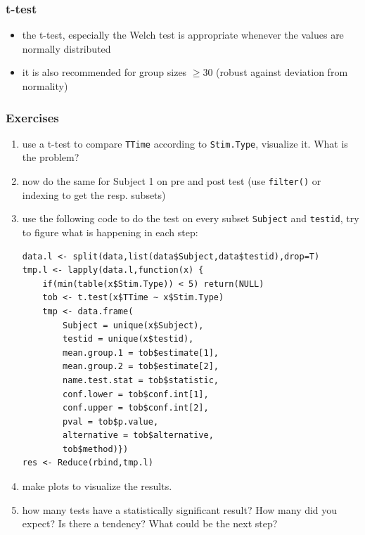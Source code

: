\documentclass[xcolor={table}]{beamer}
\begin{document}
\begin{frame}[fragile]\frametitle{t-test}
  \begin{itemize}
  \item the t-test, especially the Welch test is appropriate whenever the values are normally distributed
  \item it is also recommended for group sizes $\geq 30$ (robust against deviation from normality)
  \end{itemize}
\end{frame}

\begin{frame}\frametitle{Exercises} 
  \begin{enumerate}
  \item<1-> use a t-test to compare \texttt{TTime} according to \texttt{Stim.Type}, visualize it. What is the problem?
  \item<2-> now do the same for Subject 1 on pre and post test (use \texttt{filter()} or indexing to get the resp. subsets)
  \item<3-> use the following code to do the test on every subset \texttt{Subject} and \texttt{testid}, try to figure what is happening in each step:\tiny
\begin{verbatim}
data.l <- split(data,list(data$Subject,data$testid),drop=T)
tmp.l <- lapply(data.l,function(x) {
    if(min(table(x$Stim.Type)) < 5) return(NULL)
    tob <- t.test(x$TTime ~ x$Stim.Type)
    tmp <- data.frame(
        Subject = unique(x$Subject),
        testid = unique(x$testid),
        mean.group.1 = tob$estimate[1],
        mean.group.2 = tob$estimate[2],
        name.test.stat = tob$statistic,
        conf.lower = tob$conf.int[1],
        conf.upper = tob$conf.int[2],
        pval = tob$p.value,
        alternative = tob$alternative,
        tob$method)})
res <- Reduce(rbind,tmp.l)
\end{verbatim}
  \item<3-> make plots to visualize the results. 
  \item<4-> how many tests have a statistically significant result? How many did you expect? Is there a tendency? What could be the next step?
  \end{enumerate}
\end{frame}
\end{document}
